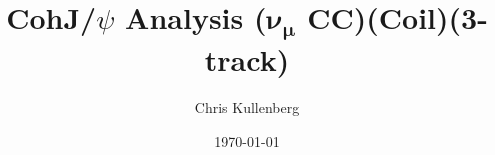 \title{CohJ/$\psi$ Analysis ($\boldsymbol{\nu_\mu}$ \textbf{CC})(\textbf{Coil})(\textbf{3-track})}
\author{Chris Kullenberg}
\date{\today}
